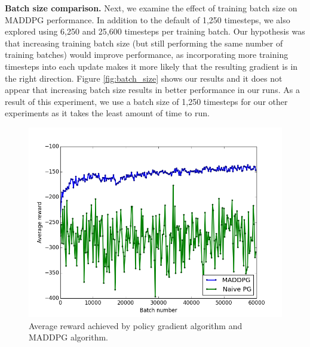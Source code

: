 \documentclass{article}
\begin{document}
\textbf{Batch size comparison.} Next, we examine the effect of training batch size on MADDPG performance. In addition to the default of 1,250 timesteps, we also explored using 6,250 and 25,600 timesteps per training batch. Our hypothesis was that increasing training batch size (but still performing the same number of training batches) would improve performance, as incorporating more training timesteps into each update makes it more likely that the resulting gradient is in the right direction. Figure \ref{fig:batch_size} shows our results and it does not appear that increasing batch size results in better performance in our runs. As a result of this experiment, we use a batch size of 1,250 timesteps for our other experiments as it takes the least amount of time to run.

\begin{figure}
\begin{center}
\includegraphics[scale=0.4]{MADDPGvsPG}
\end{center}
\caption{Average reward achieved by policy gradient algorithm and MADDPG algorithm.}
\label{fig:MADDPGvsPG}
\end{figure}
\end{document}
